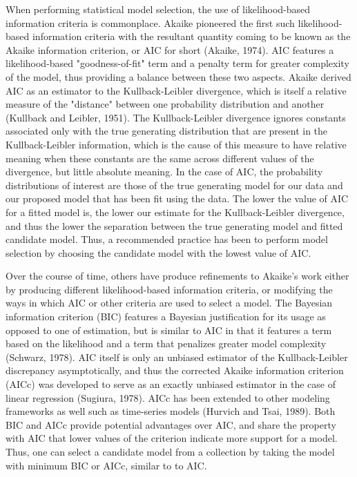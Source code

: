 		When performing statistical model selection, the use of likelihood-based information criteria is commonplace. Akaike pioneered the first such likelihood-based information criteria
		with the resultant quantity coming to be known as the Akaike information criterion, or AIC for short (Akaike, 1974). AIC features a likelihood-based "goodness-of-fit" term and a
		penalty term for greater complexity of the model, thus providing a balance between these two aspects. Akaike derived AIC as an estimator to the Kullback-Leibler divergence,
		which is itself a relative measure of the "distance" between one probability distribution and another (Kullback and Leibler, 1951). The Kullback-Leibler divergence ignores constants
		associated only with the true generating distribution that are present in the Kullback-Leibler information, which is the cause of this measure to have relative meaning when these constants
		are the same across different values of the divergence, but little absolute meaning. In the case of AIC, the probability distributions of interest are those of the true generating model
		for our data and our proposed model that has been fit using the data. The lower the value of AIC for a fitted model is, the lower our estimate for the Kullback-Leibler divergence,
		and thus the lower the separation between the true generating model and fitted candidate model. Thus, a recommended practice has been to perform model selection by choosing
		the candidate model with the lowest value of AIC.

		Over the course of time, others have produce refinements to Akaike's work either by producing different likelihood-based information criteria, or modifying the ways in which AIC or other
		criteria are used to select a model. The Bayesian information criterion (BIC) features a Bayesian justification for its usage as opposed to one of estimation, but is similar to AIC in that
		it features a term based on the likelihood and a term that penalizes greater model complexity (Schwarz, 1978). AIC itself is only an unbiased estimator of the Kullback-Leibler discrepancy
		asymptotically, and thus the corrected Akaike information criterion (AICc) was developed to serve as an exactly unbiased estimator in the case of linear regression (Sugiura, 1978). AICc has
		been extended to other modeling frameworks as well such as time-series models (Hurvich and Tsai, 1989). Both BIC and AICc provide potential advantages over AIC, and share the property with
		AIC that lower values of the criterion indicate more support for a model. Thus, one can select a candidate model from a collection by taking the model with minimum BIC or AICc, similar to
		to AIC.

